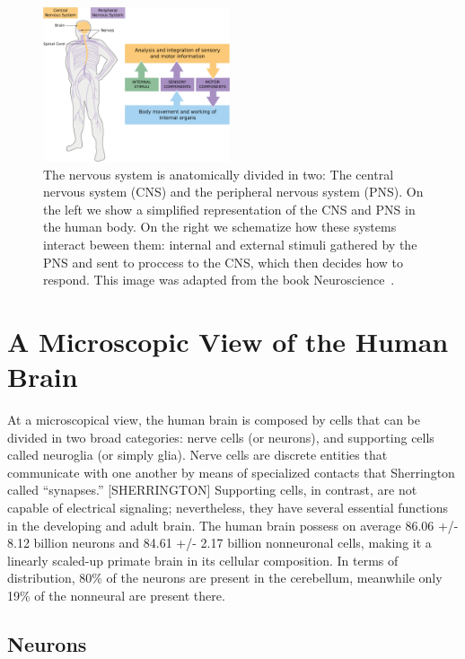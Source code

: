\begin{figure}[h]
    \includegraphics[width=0.49\textwidth]{2.neuroanatomy/img/pns_and_cns.png}
    \caption{The nervous system is anatomically divided in two: The central
             nervous system (CNS) and the peripheral nervous system (PNS).
             On the left we show a simplified representation of the CNS and
             PNS in the human body. On the right we schematize how these systems
             interact beween them: internal and external stimuli gathered by
             the PNS and sent to proccess to the CNS, which then decides how to
             respond. This image was adapted from the book Neuroscience~\cite{Johns}.}
    \label{fig:cns_and_pns}
\end{figure}  


\section{A Microscopic View of the Human Brain}
\cite{Waehnert2014}

At a microscopical view, the human brain is composed by cells that can be divided in two broad categories: nerve cells (or neurons), and supporting cells called neuroglia (or simply glia).
Nerve cells are discrete entities that communicate with one another by means of specialized contacts that Sherrington called “synapses.” [SHERRINGTON]
Supporting cells, in contrast, are not capable of electrical signaling; nevertheless, they have several essential functions in the developing and adult brain.
The human brain possess on average 86.06 +/- 8.12 billion neurons and 84.61 +/- 2.17 billion nonneuronal cells, making it a linearly scaled-up primate brain in its cellular composition.
In terms of distribution, 80\% of the neurons are present in the cerebellum, meanwhile only 19\% of the nonneural are present there.

\subsection{Neurons}

